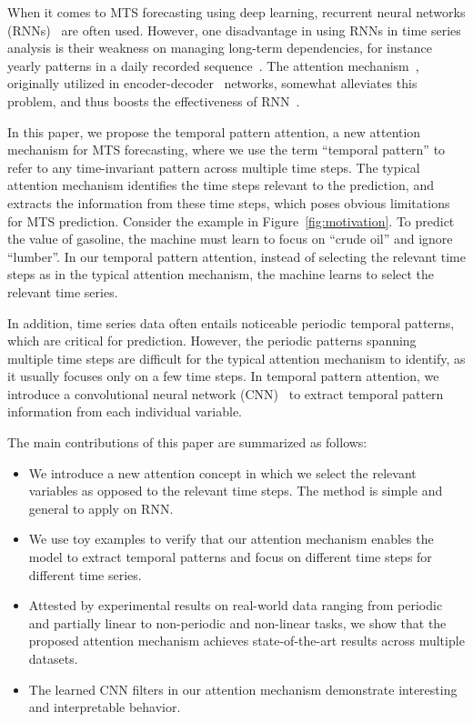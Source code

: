 When it comes to MTS forecasting using deep learning, recurrent neural networks (RNNs)~\cite{RNN_0,RNN_1,RNN_2} are often used.
However, one disadvantage in using RNNs in time series analysis is their weakness on managing long-term dependencies, for instance yearly patterns in a daily recorded sequence~\cite{properties-S2S}.
The attention mechanism~\cite{luong,bahdanau}, originally utilized in encoder-decoder~\cite{S2S} networks, somewhat alleviates this problem, and thus boosts the effectiveness of RNN~\cite{LSTNet}. 

In this paper, we propose the temporal pattern attention, a new attention mechanism for MTS forecasting, where we use the term ``temporal pattern'' to refer to any time-invariant pattern across multiple time steps. 
The typical attention mechanism identifies the time steps relevant to the prediction, and extracts the information from these time steps, which poses obvious limitations for MTS prediction.
Consider the example in Figure~\ref{fig:motivation}.
To predict the value of gasoline, the machine must learn to focus on ``crude oil'' and ignore ``lumber''.
In our temporal pattern attention, instead of selecting the relevant time steps as in the typical attention mechanism, the machine learns to select the relevant time series.


In addition, time series data often entails noticeable periodic temporal patterns, which are critical for prediction.
However, the periodic patterns  spanning multiple time steps  are difficult for the typical attention mechanism to identify, as it usually focuses only on a few time steps. 
In temporal pattern attention, we introduce a convolutional neural network (CNN)~\cite{CNN_0,CNN_1} to extract temporal pattern information from each individual variable.

The main contributions of this paper are summarized as follows:
\begin{itemize}
\item We introduce a new attention concept in which we select the relevant variables as opposed to the relevant time steps. The method is simple and general to apply on RNN.
\item We use toy examples to verify that our attention mechanism enables the model to extract temporal patterns and focus on different time steps for different time series.
\item Attested by experimental results on real-world data ranging from periodic and partially linear to non-periodic and non-linear tasks, we show that the proposed attention mechanism achieves state-of-the-art results across multiple datasets.
\item The learned CNN filters in our attention mechanism demonstrate interesting and interpretable behavior.
\end{itemize}

